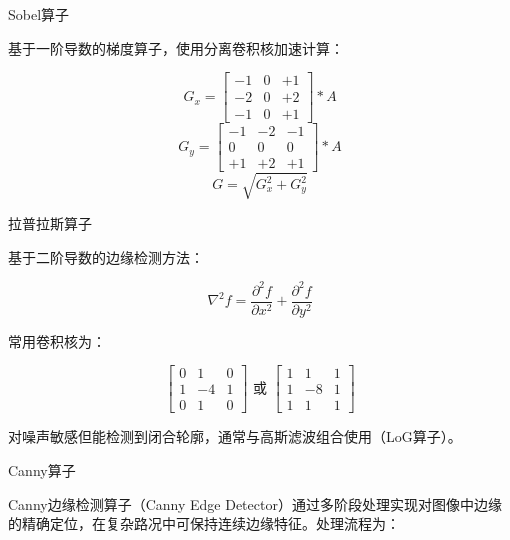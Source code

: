 \documentclass[a4paper, UTF8, fontsize=12pt]{ctexart} %
\numberwithin{equation}{section} %
\begin{document}
\begin{parlist}

\item Sobel算子

基于一阶导数的梯度算子，使用分离卷积核加速计算：

\begin{equation}
G_x = \begin{bmatrix} -1 & 0 & +1 \\ -2 & 0 & +2 \\ -1 & 0 & +1 \end{bmatrix} * A
\end{equation}
\begin{equation}
G_y = \begin{bmatrix} -1 & -2 & -1 \\ 0 & 0 & 0 \\ +1 & +2 & +1 \end{bmatrix} * A
\end{equation}
\begin{equation}
G = \sqrt{G_x^2 + G_y^2}
\end{equation}


\item 拉普拉斯算子

基于二阶导数的边缘检测方法：

\begin{equation}
\nabla^2 f = \frac{\partial^2 f}{\partial x^2} + \frac{\partial^2 f}{\partial y^2}
\end{equation}

常用卷积核为：

\begin{equation}
\begin{bmatrix} 0 & 1 & 0 \\ 1 & -4 & 1 \\ 0 & 1 & 0 \end{bmatrix} \text{ 或 } \begin{bmatrix} 1 & 1 & 1 \\ 1 & -8 & 1 \\ 1 & 1 & 1 \end{bmatrix}
\end{equation}

对噪声敏感但能检测到闭合轮廓，通常与高斯滤波组合使用（LoG算子）。


\item Canny算子

Canny边缘检测算子（Canny Edge Detector）通过多阶段处理实现对图像中边缘的精确定位，在复杂路况中可保持连续边缘特征。处理流程为：


\end{parlist}
\end{document}
